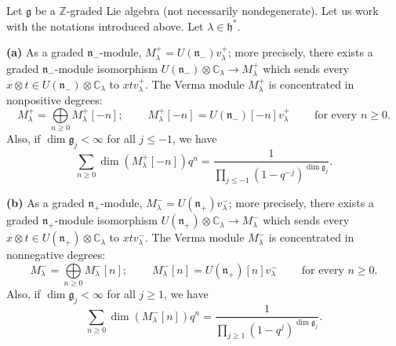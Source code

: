 \documentclass[etingof-lie.tex]{subfiles}
\begin{document}
\begin{proposition}
\label{prop.verma1}Let $\mathfrak{g}$ be a $\mathbb{Z}$-graded Lie algebra
(not necessarily nondegenerate). Let us work with the notations introduced
above. Let $\lambda\in\mathfrak{h}^{\ast}$.

\textbf{(a)} As a graded $\mathfrak{n}_{-}$-module, $M_{\lambda}^{+}=U\left(
\mathfrak{n}_{-}\right)  v_{\lambda}^{+}$; more precisely, there exists a
graded $\mathfrak{n}_{-}$-module isomorphism $U\left(  \mathfrak{n}%
_{-}\right)  \otimes\mathbb{C}_{\lambda}\rightarrow M_{\lambda}^{+}$ which
sends every $x\otimes t\in U\left(  \mathfrak{n}_{-}\right)  \otimes
\mathbb{C}_{\lambda}$ to $xtv_{\lambda}^{+}$. The Verma module $M_{\lambda
}^{+}$ is concentrated in nonpositive degrees:%
\[
M_{\lambda}^{+}=\bigoplus\limits_{n\geq0}M_{\lambda}^{+}\left[  -n\right]
;\ \ \ \ \ \ \ \ \ \ M_{\lambda}^{+}\left[  -n\right]  =U\left(
\mathfrak{n}_{-}\right)  \left[  -n\right]  v_{\lambda}^{+}%
\ \ \ \ \ \ \ \ \ \ \text{for every }n\geq0.
\]
Also, if $\dim\mathfrak{g}_{j}<\infty$ for all $j\leq-1$, we have%
\[
\sum\limits_{n\geq0}\dim\left(  M_{\lambda}^{+}\left[  -n\right]  \right)
q^{n}=\dfrac{1}{\prod\limits_{j\leq-1}\left(  1-q^{-j}\right)  ^{\dim
\mathfrak{g}_{j}}}.
\]


\textbf{(b)} As a graded $\mathfrak{n}_{+}$-module, $M_{\lambda}^{-}=U\left(
\mathfrak{n}_{+}\right)  v_{\lambda}^{-}$; more precisely, there exists a
graded $\mathfrak{n}_{+}$-module isomorphism $U\left(  \mathfrak{n}%
_{+}\right)  \otimes\mathbb{C}_{\lambda}\rightarrow M_{\lambda}^{-}$ which
sends every $x\otimes t\in U\left(  \mathfrak{n}_{+}\right)  \otimes
\mathbb{C}_{\lambda}$ to $xtv_{\lambda}^{-}$. The Verma module $M_{\lambda
}^{-}$ is concentrated in nonnegative degrees:%
\[
M_{\lambda}^{-}=\bigoplus\limits_{n\geq0}M_{\lambda}^{-}\left[  n\right]
;\ \ \ \ \ \ \ \ \ \ M_{\lambda}^{-}\left[  n\right]  =U\left(  \mathfrak{n}%
_{+}\right)  \left[  n\right]  v_{\lambda}^{-}\ \ \ \ \ \ \ \ \ \ \text{for
every }n\geq0.
\]
Also, if $\dim\mathfrak{g}_{j}<\infty$ for all $j\geq1$, we have%
\[
\sum\limits_{n\geq0}\dim\left(  M_{\lambda}^{-}\left[  n\right]  \right)
q^{n}=\dfrac{1}{\prod\limits_{j\geq1}\left(  1-q^{j}\right)  ^{\dim
\mathfrak{g}_{j}}}.
\]

\end{proposition}
\end{document}
